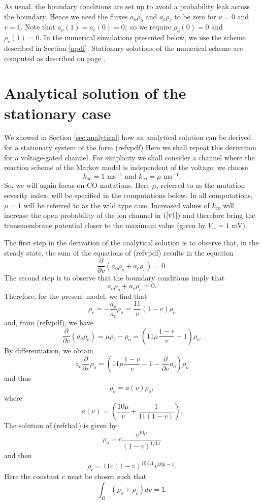 As usual, the boundary conditions are set up to avoid a probability leak
across the boundary. Hence we need the  fluxes $a_{o}\rho_{o}$ and
$a_{c}\rho_{c}$ to be zero for $v=0$ and $v=1.$ Note that $a_{o}
(1)=a_{c}(0)=0;$ so we require $\rho_{o}(0)=0$ and $\rho_{c}(1)=0.$ In
the numerical simulations presented below, we use the scheme described in
Section \ref{npdf}. Stationary solutions of the numerical scheme are computed
as described on page \pageref{accuracy}.


\section{Analytical solution of the stationary case}

We showed in Section \ref{sec:analytical} how an analytical solution can be derived
for a stationary system of the form (ref{vpdf}) Here we
shall repeat this derivation for a voltage-gated channel. For simplicity we
shall consider a channel where the reaction scheme of the Markov model is
independent of the voltage; we choose
\[
k_{oc}=1\text{ ms}^{-1}\text{ and }k_{co}=\mu\text{ ms}^{-1}.
\]
So, we will again focus on CO-mutations.
Here $\mu$, referred to as the mutation severity index,
 will be specified in the computations below.  In all computations, $\mu=1$ will be 
 referred to as the wild type case. Increased values of
$k_{co}$ will increase the open probability of the ion channel in $\left(
\ref{v1}\right)  $ and therefore bring the transmembrane potential closer to
the maximum  value (given by $V_{+}=1$ mV). 

The first step in the derivation of the analytical solution is to observe that, in the
steady state, the sum of the equations of (ref{vpdf}) results
in the equation
\[
\frac{\partial}{\partial v}\left(  a_{o}\rho_{o}+a_{c}\rho_{c}\right)  =0.
\]
The second step is to observe that the boundary conditions imply that
\[
a_{o}\rho_{o}+a_{c}\rho_{c}=0.
\]
Therefore, for the present model, we find that
\[
\rho_{c}=-\frac{a_{o}}{a_{c}}\rho_{o}=\frac{11}{v}\left(  1-v\right)  \rho_{o}
\]
and, from (ref{vpdf}), we have
\[
\frac{\partial}{\partial v}\left(  a_{o}\rho_{o}\right)  =\mu\rho_{c}-\rho
_{o}=\left(  11\mu\frac{1-v}{v}-1\right)  \rho_{o}.
\]
By differentiation, we obtain
\[
a_{o}\frac{\partial}{\partial v}\rho_{o}=\left(  11\mu\frac{1-v}{v}
-1-\frac{\partial}{\partial v}a_{o}\right)  \rho_{o}
\]
and thus
\begin{equation}
\rho_{o}^{\prime}=a(v)\rho_{o}, \label{rho1}
\end{equation}
where
\[
a(v)=\left(  \frac{10\mu}{v}+\frac{1}{11(1-v)}\right)  .
\]
The solution of (ref{rho1}) is given by
\begin{equation}
\rho_{o}=c\frac{v^{10\mu}}{\left(  1-v\right)  ^{1/11}}\label{rho2}
\end{equation}
and then
\[
\rho_{c}=11 c \left(  1-v\right)  ^{10/11}v^{10\mu-1}.
\]
Here the constant $c$ must be chosen such that
\[
\int_{\Omega}\left(  \rho_{o}+\rho_{c}\right)  dv=1.
\]

